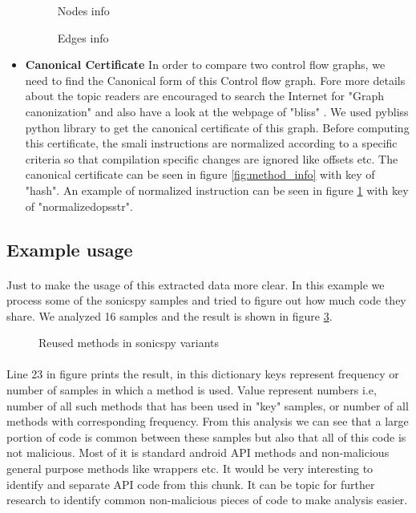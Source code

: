 \documentclass[../main.tex]{subfile}
\begin{document}
\begin{itemize}
			\begin{figure}
				\centering
				\caption{Nodes info}
				\label{fig:nodes_info}	
			\end{figure}

			\begin{figure}
				\centering
				\caption{Edges info}
				\label{fig:edges_info}	
			\end{figure}
		

			\item \textbf{Canonical Certificate} In order to compare two control flow graphs, we need to find the Canonical form of this Control flow graph. Fore more details about the topic readers are encouraged to search the Internet for "Graph canonization" and also have a look at the webpage of "bliss" \cite{bliss}. We used pybliss python library \cite{bliss} \cite{junttila2007engineering} to get the canonical certificate of this graph. Before computing this certificate, the smali instructions are normalized according to a specific criteria so that compilation specific changes are ignored like offsets etc. The canonical certificate can be seen in figure \ref{fig:method_info} with key of "hash". An example of normalized instruction can be seen in figure \ref{fig:nodes_info} with key of "normalized\textunderscore ops\textunderscore str".
		\end{itemize}
		
		\subsection{Example usage}
		\paragraph{}Just to make the usage of this extracted data more clear. In this example we process some of the sonicspy samples and tried to figure out how much code they share. We analyzed 16 samples and the result is shown in figure \ref{fig:sonicspy_freq}.
		
		\begin{figure}[h]
			\centering
			\caption{Reused methods in sonicspy variants}
			\label{fig:sonicspy_freq}
		\end{figure}
		\paragraph{} Line 23 in figure prints the result, in this dictionary keys represent frequency or number of samples in which a method is used. Value represent numbers i.e, number of all such methods that has been used in "key" samples, or number of all methods with corresponding frequency. From this analysis we can see that a large portion of code is common between these samples but also that all of this code is not malicious. Most of it is standard android API methods and non-malicious general purpose methods like wrappers etc. It would be very interesting to identify and separate API code from this chunk. It can be topic for further research to identify common non-malicious pieces of code to make analysis easier. 
\end{document}
